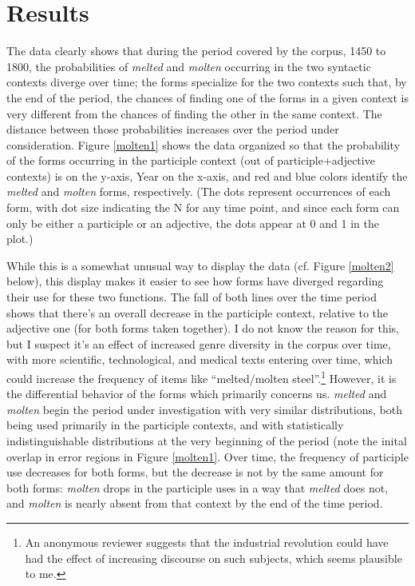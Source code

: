 \documentclass{artikel3}
\begin{document}
\section{Results}
\label{results}

The data clearly shows that during the period covered by the corpus, 1450 to 1800, the probabilities of \textsl{melted} and \textsl{molten} occurring in the two syntactic contexts diverge over time; the forms specialize for the two contexts such that, by the end of the period, the chances of finding one of the forms in a given context is very different from the chances of finding the other in the same context. The distance between those probabilities increases over the period under consideration. Figure \ref{molten1} shows the data organized so that the probability of the forms occurring in the participle context (out of participle+adjective contexts) is on the y-axis, Year on the x-axis, and red and blue colors identify the \textsl{melted} and \textsl{molten} forms, respectively. (The dots represent occurrences of each form, with dot size indicating the N for any time point, and since each form can only be either a participle or an adjective, the dots appear at 0 and 1 in the plot.)

While this is a somewhat unusual way to display the data (cf. Figure \ref{molten2} below), this display makes it easier to see how forms have diverged regarding their use for these two functions. The fall of both lines over the time period shows that there's an overall decrease in the participle context, relative to the adjective one (for both forms taken together).  I do not know the reason for this, but I suspect it's an effect of increased genre diversity in the corpus over time, with more scientific, technological, and medical texts entering over time, which could increase the frequency of items like ``melted/molten steel''.\footnote{An anonymous reviewer suggests that the industrial revolution could have had the effect of increasing discourse on such subjects, which seems plausible to me.} However, it is the differential behavior of the forms which primarily concerns us. \textsl{melted} and \textsl{molten} begin the period under investigation with very similar distributions, both being used primarily in the participle contexts, and with statistically indistinguishable distributions at the very beginning of the period (note the inital overlap in error regions in Figure \ref{molten1}. Over time, the frequency of participle use decreases for both forms, but the decrease is not by the same amount for both forms: \textsl{molten} drops in the participle uses in a way that \textsl{melted} does not, and \textsl{molten} is nearly absent from that context by the end of the time period.
\end{document}
